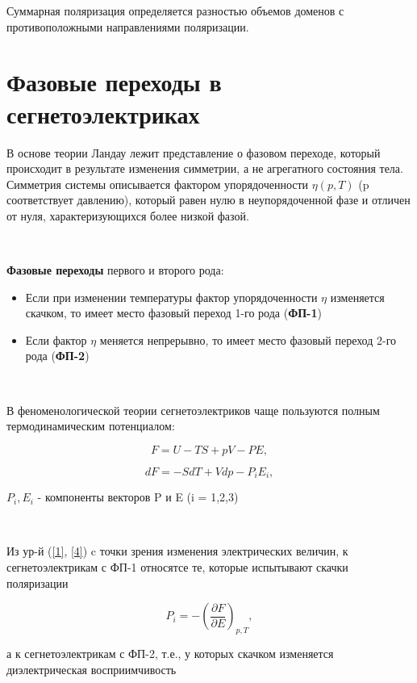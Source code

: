 \documentclass[a4paper]{article}
\begin{document}
Суммарная поляризация определяется разностью объемов доменов с противоположными направлениями поляризации. 


\section{Фазовые переходы в сегнетоэлектриках}

В основе теории Ландау лежит представление о фазовом переходе, который происходит в результате изменения симметрии, а не агрегатного состояния тела. Симметрия системы описывается фактором упорядоченности $\eta (p, T)$ (p соответствует давлению), который равен нулю в неупорядоченной фазе и отличен от нуля, характеризующихся более низкой фазой. 

\

\textbf{Фазовые переходы} первого и второго рода:

\begin{itemize}

\item
Если при изменении температуры фактор упорядоченности $\eta$ изменяется скачком, то имеет место фазовый переход 1-го рода (\textbf{ФП-1})

\item
Если фактор $\eta$ меняется непрерывно, то имеет место фазовый переход 2-го рода (\textbf{ФП-2})
\end{itemize}

\

В феноменологической теории сегнетоэлектриков чаще пользуются полным термодинамическим потенциалом:

\begin{equation}
F = U - TS + pV - PE,
\label{3}
\end{equation}

\begin{equation}
dF = -SdT + Vdp - P_iE_i,
\label{4}
\end{equation}

$P_i, E_i$ - компоненты векторов P и E (i = 1,2,3)

\

Из ур-й (\ref{1}, \ref{4}) c точки зрения изменения электрических величин, к сегнетоэлектрикам с ФП-1 относятсе те, которые испытывают скачки поляризации 

\begin{equation}
P_i =- \left( \frac{\partial F}{\partial E} \right)_{p, T},
\label{7}
\end{equation}

а к сегнетоэлектрикам с ФП-2, т.е., у которых скачком изменяется диэлектрическая восприимчивость
\end{document}
